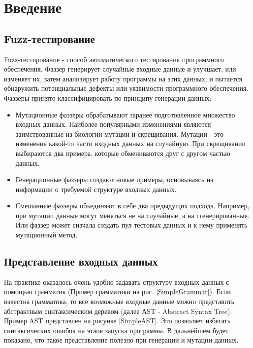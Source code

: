 \documentclass[a4paper]{article}
\begin{document}
\newpage
\section{Введение}

\subsection{Fuzz-тестирование}
\indent

Fuzz-тестирование - способ автоматического тестирования программного обеспечения. Фаззер генерирует случайные входные данные и улучшает, или изменяет их, затем анализирует работу программы на этих данных, и пытается обнаружить потенциальные дефекты или уязвимости программного обеспечения. Фаззеры принято классифицировать по принципу генерации данных:

\begin{itemize}
\item Мутационные фаззеры обрабатывают заранее подготовленное множество входных данных. Наиболее популярными изменениями являются заимствованные из биологии мутации и скрещивания. Мутации - это изменение какой-то части входных данных на случайную. При скрещивании выбираются два примера, которые обмениваются друг с другом частью данных.
\item Генерационные фаззеры создают новые примеры, основываясь на информации о требуемой структуре входных данных. 
\item Смешанные фаззеры объединяют в себе два предыдущих подхода. Например, при мутации данные могут меняться не на случайные, а на сгенерированные. Или фаззер может сначала создать пул тестовых данных и к нему применять мутационный метод. 
\end{itemize}

\subsection{Представление входных данных}
\indent

На практике оказалось очень удобно задавать структуру входных данных с помощью грамматик (Пример грамматики на рис. \ref{SimpleGrammar}). Если известна грамматика, то все возможные входные данные можно представить абстрактным синтаксическим деревом (далее АST - Abstract Syntax Tree). Пример AST представлен на рисунке \ref{SimpleAST}. Это позволяет избегать синтаксических ошибок на этапе запуска программы. В дальнейшем будет показано, что такое представление полезно при генерации и мутации данных.
\end{document}
